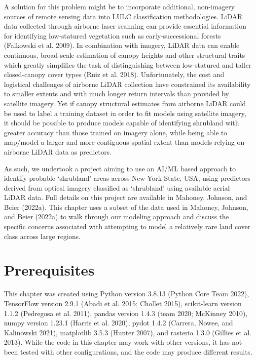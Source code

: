 \documentclass[
  letterpaper,
  DIV=11,
  numbers=noendperiod]{scrartcl}
\begin{document}
A solution for this problem might be to incorporate additional,
non-imagery sources of remote sensing data into LULC classification
methodologies. LiDAR data collected through airborne laser scanning can
provide essential information for identifying low-statured vegetation
such as early-successional forests (Falkowski et al. 2009). In
combination with imagery, LiDAR data can enable continuous, broad-scale
estimation of canopy heights and other structural traits which greatly
simplifies the task of distinguishing between low-statured and taller
closed-canopy cover types (Ruiz et al. 2018). Unfortunately, the cost
and logistical challenges of airborne LiDAR collection have constrained
its availability to smaller extents and with much longer return
intervals than provided by satellite imagery. Yet if canopy structural
estimates from airborne LiDAR could be used to label a training dataset
in order to fit models using satellite imagery, it should be possible to
produce models capable of identifying shrubland with greater accuracy
than those trained on imagery alone, while being able to map/model a
larger and more contiguous spatial extent than models relying on
airborne LiDAR data as predictors.

As such, we undertook a project aiming to use an AI/ML based approach to
identify probable `shrubland' areas across New York State, USA, using
predictors derived from optical imagery classified as `shrubland' using
available aerial LiDAR data. Full details on this project are available
in Mahoney, Johnson, and Beier (2022a). This chapter uses a subset of
the data used in Mahoney, Johnson, and Beier (2022a) to walk through our
modeling approach and discuss the specific concerns associated with
attempting to model a relatively rare land cover class across large
regions.

\hypertarget{prerequisites}{%
\section{Prerequisites}\label{prerequisites}}

This chapter was created using Python version 3.8.13 (Python Core Team
2022), TensorFlow version 2.9.1 (Abadi et al. 2015; Chollet 2015),
scikit-learn version 1.1.2 (Pedregosa et al. 2011), pandas version 1.4.3
(team 2020; McKinney 2010), numpy version 1.23.1 (Harris et al. 2020),
pydot 1.4.2 (Carrera, Nowee, and Kalinowski 2021), matplotlib 3.5.3
(Hunter 2007), and rasterio 1.3.0 (Gillies et al. 2013). While the code
in this chapter may work with other versions, it has not been tested
with other configurations, and the code may produce different results.
\end{document}
